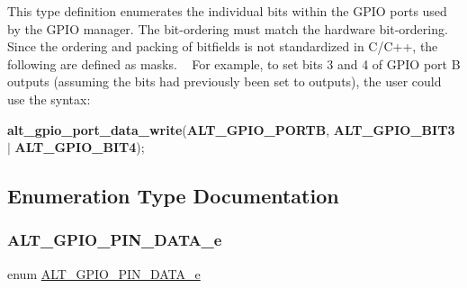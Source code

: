 This type definition enumerates the individual bits within the G\+P\+IO ports used by the G\+P\+IO manager. The bit-\/ordering must match the hardware bit-\/ordering. Since the ordering and packing of bitfields is not standardized in C/\+C++, the following are defined as masks. ~\newline
For example, to set bits 3 and 4 of G\+P\+IO port B outputs (assuming the bits had previously been set to outputs), the user could use the syntax\+: \begin{DoxyParagraph}{}
{\bfseries{alt\+\_\+gpio\+\_\+port\+\_\+data\+\_\+write}}({\bfseries{A\+L\+T\+\_\+\+G\+P\+I\+O\+\_\+\+P\+O\+R\+TB}}, {\bfseries{A\+L\+T\+\_\+\+G\+P\+I\+O\+\_\+\+B\+I\+T3}} {\bfseries{}}$\vert$ {\bfseries{A\+L\+T\+\_\+\+G\+P\+I\+O\+\_\+\+B\+I\+T4}}); 
\end{DoxyParagraph}


\subsection{Enumeration Type Documentation}
\mbox{\label{group__ALT__GPIO__API__CONFIG_gac392f6d8108c038acc4ab0b1533c2eef}} 
\subsubsection{\texorpdfstring{ALT\_GPIO\_PIN\_DATA\_e}{ALT\_GPIO\_PIN\_DATA\_e}}
{\footnotesize\ttfamily enum \mbox{\hyperlink{group__ALT__GPIO__API__CONFIG_gac392f6d8108c038acc4ab0b1533c2eef}{A\+L\+T\+\_\+\+G\+P\+I\+O\+\_\+\+P\+I\+N\+\_\+\+D\+A\+T\+A\+\_\+e}}}

